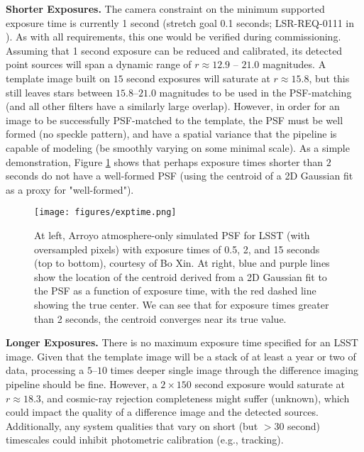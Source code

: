 \documentclass[DM,lsstdoc,toc]{lsstdoc}
\begin{document}
\textbf{Shorter Exposures.} The camera constraint on the minimum supported exposure time is currently 1 second (stretch goal 0.1 seconds; LSR-REQ-0111 in ).
As with all requirements, this one would be verified during commissioning.
Assuming that 1 second exposure can be reduced and calibrated, its detected point sources will span a dynamic range of $r \approx 12.9$ -- $21.0$ magnitudes.
A template image built on $15$ second exposures will saturate at $r \approx 15.8$, but this still leaves stars between $15.8$--$21.0$ magnitudes to be used in the PSF-matching (and all other filters have a similarly large overlap).
However, in order for an image to be successfully PSF-matched to the template, the PSF must be well formed (no speckle pattern), and have a spatial variance that the pipeline is capable of modeling (be smoothly varying on some minimal scale).
As a simple demonstration, Figure \ref{fig:expt} shows that perhaps exposure times shorter than $2$ seconds do not have a well-formed PSF (using the centroid of a 2D Gaussian fit as a proxy for "well-formed").

\begin{figure}
\begin{center}
\texttt{[image: figures/exptime.png]}
\caption{At left, Arroyo atmosphere-only simulated PSF for LSST (with oversampled pixels) with exposure times of 0.5, 2, and 15 seconds (top to bottom), courtesy of Bo Xin. At right, blue and purple lines show the location of the centroid derived from a 2D Gaussian fit to the PSF as a function of exposure time, with the red dashed line showing the true center. We can see that for exposure times greater than 2 seconds, the centroid converges near its true value. \label{fig:expt}}
\end{center}
\end{figure}

\textbf{Longer Exposures.} There is no maximum exposure time specified for an LSST image.
Given that the template image will be a stack of at least a year or two of data, processing a $5$--$10$ times deeper single image through the difference imaging pipeline should be fine.
However, a $2\times150$ second exposure would saturate at $r \approx 18.3$, and cosmic-ray rejection completeness might suffer (unknown), which could impact the quality of a difference image and the detected sources.
Additionally, any system qualities that vary on short (but $>30$ second) timescales could inhibit photometric calibration (e.g., tracking).
\end{document}
